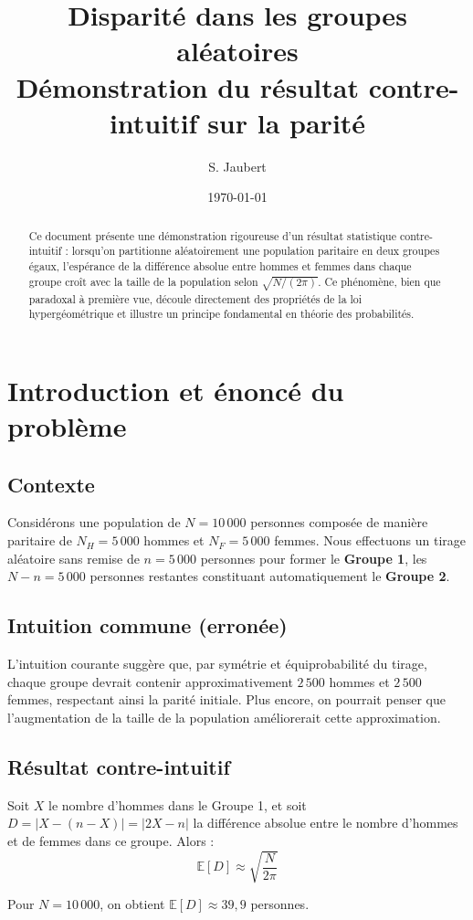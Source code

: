 \documentclass[11pt,a4paper]{article}
\title{\textbf{Disparité dans les groupes aléatoires}\\[0.5em]
\large Démonstration du résultat contre-intuitif sur la parité}
\author{S. Jaubert}
\date{\today}
\theoremstyle{definition}
\theoremstyle{remark}
\begin{document}
\maketitle

\begin{abstract}
Ce document présente une démonstration rigoureuse d'un résultat statistique contre-intuitif : lorsqu'on partitionne aléatoirement une population paritaire en deux groupes égaux, l'espérance de la différence absolue entre hommes et femmes dans chaque groupe croît avec la taille de la population selon $\sqrt{N/(2\pi)}$. Ce phénomène, bien que paradoxal à première vue, découle directement des propriétés de la loi hypergéométrique et illustre un principe fondamental en théorie des probabilités.
\end{abstract}

\tableofcontents

\section{Introduction et énoncé du problème}

\subsection{Contexte}

Considérons une population de $N = 10\,000$ personnes composée de manière paritaire de $N_H = 5\,000$ hommes et $N_F = 5\,000$ femmes. Nous effectuons un tirage aléatoire sans remise de $n = 5\,000$ personnes pour former le \textbf{Groupe 1}, les $N - n = 5\,000$ personnes restantes constituant automatiquement le \textbf{Groupe 2}.

\subsection{Intuition commune (erronée)}

L'intuition courante suggère que, par symétrie et équiprobabilité du tirage, chaque groupe devrait contenir approximativement $2\,500$ hommes et $2\,500$ femmes, respectant ainsi la parité initiale. Plus encore, on pourrait penser que l'augmentation de la taille de la population améliorerait cette approximation.

\subsection{Résultat contre-intuitif}

\begin{tcolorbox}[colback=maincolor!10,colframe=maincolor,title=Résultat principal]
Soit $X$ le nombre d'hommes dans le Groupe 1, et soit $D = |X - (n-X)| = |2X - n|$ la différence absolue entre le nombre d'hommes et de femmes dans ce groupe. Alors :
\begin{equation}
\mathbb{E}[D] \approx \sqrt{\frac{N}{2\pi}}
\end{equation}

Pour $N = 10\,000$, on obtient $\mathbb{E}[D] \approx 39{,}9$ personnes.
\end{tcolorbox}
\end{document}
